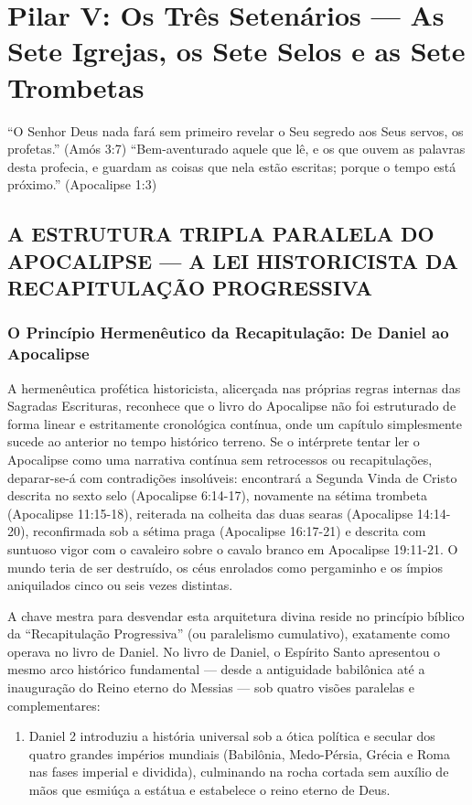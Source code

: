 \chapter{Pilar V: Os Três Setenários — As Sete Igrejas, os Sete Selos e as Sete Trombetas}





``O Senhor Deus nada fará sem primeiro revelar o Seu segredo aos Seus servos, os profetas.'' (Amós 3:7)
``Bem-aventurado aquele que lê, e os que ouvem as palavras desta profecia, e guardam as coisas que nela estão escritas; porque o tempo está próximo.'' (Apocalipse 1:3)



\section{A ESTRUTURA TRIPLA PARALELA DO APOCALIPSE — A LEI HISTORICISTA DA RECAPITULAÇÃO PROGRESSIVA}



\subsection{O Princípio Hermenêutico da Recapitulação: De Daniel ao Apocalipse}


A hermenêutica profética historicista, alicerçada nas próprias regras internas das Sagradas Escrituras, reconhece que o livro do Apocalipse não foi estruturado de forma linear e estritamente cronológica contínua, onde um capítulo simplesmente sucede ao anterior no tempo histórico terreno. Se o intérprete tentar ler o Apocalipse como uma narrativa contínua sem retrocessos ou recapitulações, deparar-se-á com contradições insolúveis: encontrará a Segunda Vinda de Cristo descrita no sexto selo (Apocalipse 6:14-17), novamente na sétima trombeta (Apocalipse 11:15-18), reiterada na colheita das duas searas (Apocalipse 14:14-20), reconfirmada sob a sétima praga (Apocalipse 16:17-21) e descrita com suntuoso vigor com o cavaleiro sobre o cavalo branco em Apocalipse 19:11-21. O mundo teria de ser destruído, os céus enrolados como pergaminho e os ímpios aniquilados cinco ou seis vezes distintas.

A chave mestra para desvendar esta arquitetura divina reside no princípio bíblico da ``Recapitulação Progressiva'' (ou paralelismo cumulativo), exatamente como operava no livro de Daniel. No livro de Daniel, o Espírito Santo apresentou o mesmo arco histórico fundamental — desde a antiguidade babilônica até a inauguração do Reino eterno do Messias — sob quatro visões paralelas e complementares:
\begin{enumerate}
  \item Daniel 2 introduziu a história universal sob a ótica política e secular dos quatro grandes impérios mundiais (Babilônia, Medo-Pérsia, Grécia e Roma nas fases imperial e dividida), culminando na rocha cortada sem auxílio de mãos que esmiúça a estátua e estabelece o reino eterno de Deus.
\end{enumerate}

